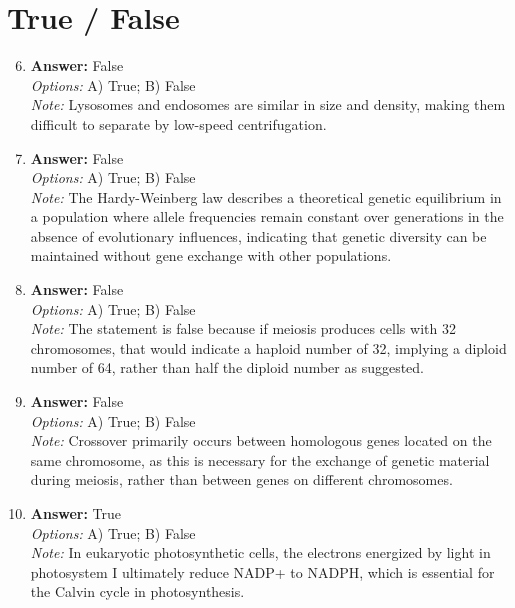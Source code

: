 \documentclass[12pt]{article}
\begin{document}
\section*{True / False}
\begin{enumerate}[label=\arabic*.]
\setcounter{enumi}{5}
\item \textbf{Answer:} False
\\ \textit{Options:} A) True; B) False
\\ \textit{Note:} Lysosomes and endosomes are similar in size and density, making them difficult to separate by low-speed centrifugation.
\item \textbf{Answer:} False
\\ \textit{Options:} A) True; B) False
\\ \textit{Note:} The Hardy-Weinberg law describes a theoretical genetic equilibrium in a population where allele frequencies remain constant over generations in the absence of evolutionary influences, indicating that genetic diversity can be maintained without gene exchange with other populations.
\item \textbf{Answer:} False
\\ \textit{Options:} A) True; B) False
\\ \textit{Note:} The statement is false because if meiosis produces cells with 32 chromosomes, that would indicate a haploid number of 32, implying a diploid number of 64, rather than half the diploid number as suggested.
\item \textbf{Answer:} False
\\ \textit{Options:} A) True; B) False
\\ \textit{Note:} Crossover primarily occurs between homologous genes located on the same chromosome, as this is necessary for the exchange of genetic material during meiosis, rather than between genes on different chromosomes.
\item \textbf{Answer:} True
\\ \textit{Options:} A) True; B) False
\\ \textit{Note:} In eukaryotic photosynthetic cells, the electrons energized by light in photosystem I ultimately reduce NADP+ to NADPH, which is essential for the Calvin cycle in photosynthesis.
\end{enumerate}
\end{document}
